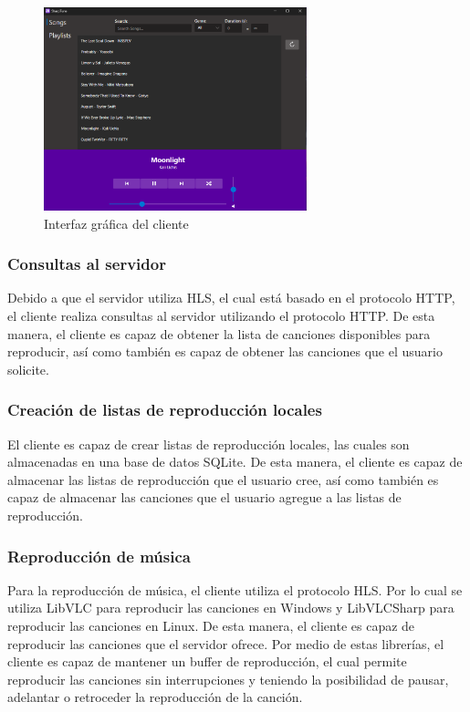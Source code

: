\begin{figure}
    \centering
    \includegraphics[width=3in]{assets/app.png}
    \caption{Interfaz gráfica del cliente}
    \label{fig:app}
\end{figure}

\subsubsection{Consultas al servidor}

Debido a que el servidor utiliza HLS, el cual está basado en el protocolo HTTP,
el cliente realiza consultas al servidor utilizando el protocolo HTTP. De esta
manera, el cliente es capaz de obtener la lista de canciones disponibles para
reproducir, así como también es capaz de obtener las canciones que el usuario
solicite.

\subsubsection{Creación de listas de reproducción locales}

El cliente es capaz de crear listas de reproducción locales, las cuales son
almacenadas en una base de datos SQLite. De esta manera, el cliente es capaz de
almacenar las listas de reproducción que el usuario cree, así como también es
capaz de almacenar las canciones que el usuario agregue a las listas de
reproducción.

\subsubsection{Reproducción de música}

Para la reproducción de música, el cliente utiliza el protocolo HLS. Por lo cual 
se utiliza LibVLC para reproducir las canciones en Windows y LibVLCSharp para
reproducir las canciones en Linux. De esta manera, el cliente es capaz de
reproducir las canciones que el servidor ofrece. Por medio de estas librerías,
el cliente es capaz de mantener un buffer de reproducción, el cual permite
reproducir las canciones sin interrupciones y teniendo la posibilidad 
de pausar, adelantar o retroceder la reproducción de la canción.

